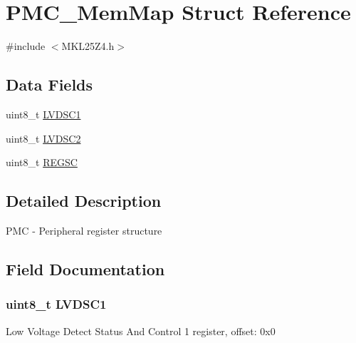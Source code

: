 \hypertarget{struct_p_m_c___mem_map}{}\section{P\+M\+C\+\_\+\+Mem\+Map Struct Reference}
\label{struct_p_m_c___mem_map}


{\ttfamily \#include $<$M\+K\+L25\+Z4.\+h$>$}

\subsection*{Data Fields}
\begin{DoxyCompactItemize}
\item 
uint8\+\_\+t \hyperlink{struct_p_m_c___mem_map_a6f2f8cc9aa750a607962dfba64acf50e}{L\+V\+D\+S\+C1}
\item 
uint8\+\_\+t \hyperlink{struct_p_m_c___mem_map_a63e1dd6700199a875c987cca4676b084}{L\+V\+D\+S\+C2}
\item 
uint8\+\_\+t \hyperlink{struct_p_m_c___mem_map_a9786fdb50c1bad04aedb8b090e2eaddf}{R\+E\+G\+S\+C}
\end{DoxyCompactItemize}


\subsection{Detailed Description}
P\+M\+C -\/ Peripheral register structure 

\subsection{Field Documentation}
\hypertarget{struct_p_m_c___mem_map_a6f2f8cc9aa750a607962dfba64acf50e}{}
\subsubsection[{L\+V\+D\+S\+C1}]{\setlength{\rightskip}{0pt plus 5cm}uint8\+\_\+t L\+V\+D\+S\+C1}\label{struct_p_m_c___mem_map_a6f2f8cc9aa750a607962dfba64acf50e}
Low Voltage Detect Status And Control 1 register, offset\+: 0x0 \hypertarget{struct_p_m_c___mem_map_a63e1dd6700199a875c987cca4676b084}{}
